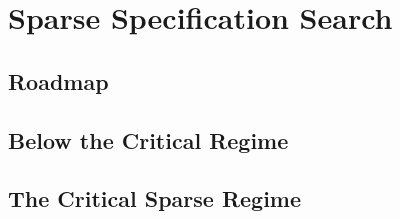 \section{Sparse Specification Search}
\label{sec:sparse-search}


\subsection{Roadmap}

%
%

\subsection{Below the Critical Regime}

%

\subsection{The Critical Sparse Regime}

%

